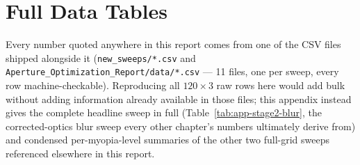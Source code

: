 \chapter{Full Data Tables}
\label{app:data}

Every number quoted anywhere in this report comes from one of the CSV files shipped
alongside it (\texttt{new\_sweeps/*.csv} and \texttt{Aperture\_Optimization\_Report/data/*.csv}
--- 11 files, one per sweep, every row machine-checkable). Reproducing all
$120\times3$ raw rows here would add bulk without adding information already
available in those files; this appendix instead gives the complete headline sweep in
full (Table~\ref{tab:app-stage2-blur}, the corrected-optics blur sweep every other
chapter's numbers ultimately derive from) and condensed per-myopia-level summaries of
the other two full-grid sweeps referenced elsewhere in this report.




